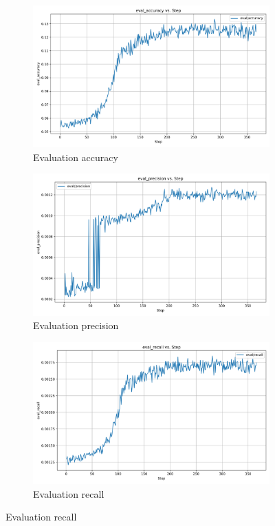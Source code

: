 \documentclass[12pt]{article}
\begin{document}
\begin{figure}[!ht]
	\centering
	\begin{subfigure}[b]{0.32\textwidth}
	\includegraphics[width=\linewidth]{eval_accuracy.png}
	\caption{Evaluation accuracy}
	\end{subfigure}
\hfill
\begin{subfigure}[b]{0.32\textwidth}
	\includegraphics[width=\linewidth]{eval_precision.png}
	\caption{Evaluation precision}
	\end{subfigure}
\hfill
\begin{subfigure}[b]{0.32\textwidth}
	\includegraphics[width=\linewidth]{eval_recall.png}
	\caption{Evaluation recall}
	\end{subfigure}
\end{figure}
\end{document}
